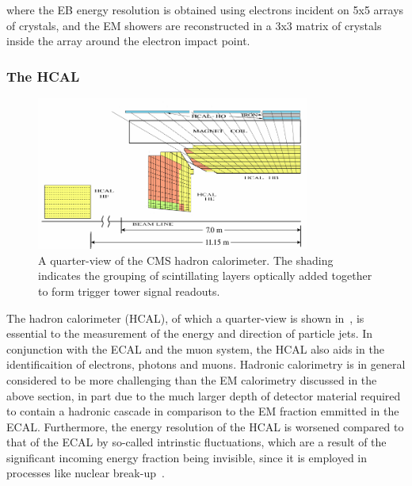 where the EB energy resolution is obtained using electrons incident on 5x5 arrays of crystals, and the EM showers are reconstructed in a 3x3 matrix of crystals inside the array around the electron impact point. 

\subsubsection{The HCAL}
\label{subsubsec:HCAL}

\begin{figure}
  \centering
  \includegraphics[width=0.8\textwidth]{figs/quarterHCAL}
  \caption{A quarter-view of the CMS hadron calorimeter. The shading indicates the grouping of scintillating layers optically added together to form trigger tower signal readouts.~\cite{Chatrchyan:2009hy}}
  \label{fig:hcal}
\end{figure}

The hadron calorimeter (HCAL), of which a quarter-view is shown in~, is essential to the measurement of the energy and direction of particle jets. In conjunction with the ECAL and the muon system, the HCAL also aids in the identificaition of electrons, photons and muons. Hadronic calorimetry is in general considered to be more challenging than the EM calorimetry discussed in the above section, in part due to the much larger depth of detector material required to contain a hadronic cascade in comparison to the EM fraction emmitted in the ECAL. Furthermore, the energy resolution of the HCAL is worsened compared to that of the ECAL by so-called intrinstic fluctuations, which are a result of the significant incoming energy fraction being invisible, since it is employed in processes like nuclear break-up~\cite{Leroy:2004zza}. 

